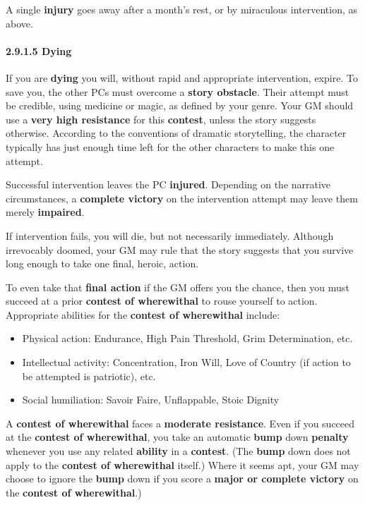 \documentclass[
]{article}
\providecommand{\tightlist}{%
  \setlength{\itemsep}{0pt}\setlength{\parskip}{0pt}}
\begin{document}
A single \textbf{injury} goes away after a month's rest, or by
miraculous intervention, as above.

\hypertarget{dying}{%
\paragraph{2.9.1.5 Dying}\label{dying}}

If you are \textbf{dying} you will, without rapid and appropriate
intervention, expire. To save you, the other PCs must overcome a
\textbf{story obstacle}. Their attempt must be credible, using medicine
or magic, as defined by your genre. Your GM should use a \textbf{very
high resistance} for this \textbf{contest}, unless the story suggests
otherwise. According to the conventions of dramatic storytelling, the
character typically has just enough time left for the other characters
to make this one attempt.

Successful intervention leaves the PC \textbf{injured}. Depending on the
narrative circumstances, a \textbf{complete victory} on the intervention
attempt may leave them merely \textbf{impaired}.

If intervention fails, you will die, but not necessarily immediately.
Although irrevocably doomed, your GM may rule that the story suggests
that you survive long enough to take one final, heroic, action.

To even take that \textbf{final action} if the GM offers you the chance,
then you must succeed at a prior \textbf{contest of wherewithal} to
rouse yourself to action. Appropriate abilities for the \textbf{contest
of wherewithal} include:

\begin{itemize}
\tightlist
\item
  Physical action: Endurance, High Pain Threshold, Grim Determination,
  etc.
\item
  Intellectual activity: Concentration, Iron Will, Love of Country (if
  action to be attempted is patriotic), etc.
\item
  Social humiliation: Savoir Faire, Unflappable, Stoic Dignity
\end{itemize}

A \textbf{contest of wherewithal} faces a \textbf{moderate resistance}.
Even if you succeed at the \textbf{contest of wherewithal}, you take an
automatic \textbf{bump} down \textbf{penalty} whenever you use any
related \textbf{ability} in a \textbf{contest}. (The \textbf{bump} down
does not apply to the \textbf{contest of wherewithal} itself.) Where it
seems apt, your GM may choose to ignore the \textbf{bump} down if you
score a \textbf{major or complete victory} on the \textbf{contest of
wherewithal}.)
\end{document}
